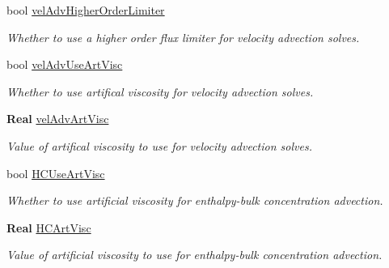 \begin{DoxyCompactItemize}
\mbox{\label{struct_mushy_layer_options_a06bd61e2ae80e93bfed2fbdc789aded6}} 
bool \hyperlink{struct_mushy_layer_options_a06bd61e2ae80e93bfed2fbdc789aded6}{vel\+Adv\+Higher\+Order\+Limiter}
\begin{DoxyCompactList}\small\item\em Whether to use a higher order flux limiter for velocity advection solves. \end{DoxyCompactList}\item 
\mbox{\label{struct_mushy_layer_options_aeb223c8f5df7b572753bf11a28b25ead}} 
bool \hyperlink{struct_mushy_layer_options_aeb223c8f5df7b572753bf11a28b25ead}{vel\+Adv\+Use\+Art\+Visc}
\begin{DoxyCompactList}\small\item\em Whether to use artifical viscosity for velocity advection solves. \end{DoxyCompactList}\item 
\textbf{ Real} \hyperlink{struct_mushy_layer_options_a9c2d1485bfcf48a0b18a07861ea5a3b8}{vel\+Adv\+Art\+Visc}
\begin{DoxyCompactList}\small\item\em Value of artifical viscosity to use for velocity advection solves. \end{DoxyCompactList}\item 
\mbox{\label{struct_mushy_layer_options_af347434ca002565471a46ab274d2ab7b}} 
bool \hyperlink{struct_mushy_layer_options_af347434ca002565471a46ab274d2ab7b}{H\+C\+Use\+Art\+Visc}
\begin{DoxyCompactList}\small\item\em Whether to use artificial viscosity for enthalpy-\/bulk concentration advection. \end{DoxyCompactList}\item 
\mbox{\label{struct_mushy_layer_options_a918705dd9c687c689e6168e79e3c8b54}} 
\textbf{ Real} \hyperlink{struct_mushy_layer_options_a918705dd9c687c689e6168e79e3c8b54}{H\+C\+Art\+Visc}
\begin{DoxyCompactList}\small\item\em Value of artificial viscosity to use for enthalpy-\/bulk concentration advection. \end{DoxyCompactList}\item 

\end{DoxyCompactItemize}
